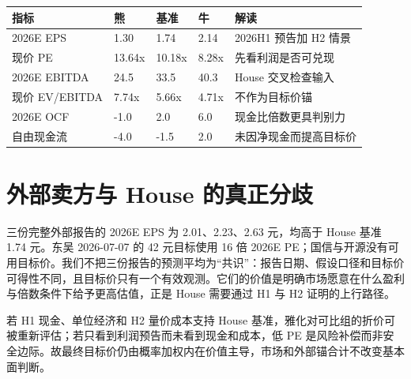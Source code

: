 \begin{exhibitbox}[表 12-2：现价下的盈利和资本约束交叉检查]
\begin{tabularx}{\exhibitboxwidth}{L{3.0cm}R{2.0cm}R{2.0cm}R{2.0cm}X}
\toprule
指标 & 熊 & 基准 & 牛 & 解读 \\
\midrule
2026E EPS & 1.30 & 1.74 & 2.14 & 2026H1 预告加 H2 情景 \\
现价 PE & 13.64x & 10.18x & 8.28x & 先看利润是否可兑现 \\
2026E EBITDA & 24.5 & 33.5 & 40.3 & House 交叉检查输入 \\
现价 EV/EBITDA & 7.74x & 5.66x & 4.71x & 不作为目标价锚 \\
2026E OCF & -1.0 & 2.0 & 6.0 & 现金比倍数更具判别力 \\
自由现金流 & -4.0 & -1.5 & 2.0 & 未因净现金而提高目标价 \\
\bottomrule
\end{tabularx}
\end{exhibitbox}

\section{外部卖方与 House 的真正分歧}

三份完整外部报告的 2026E EPS 为 2.01、2.23、2.63 元，均高于 House 基准 1.74 元。东吴 2026-07-07 的 42 元目标使用 16 倍 2026E PE；国信与开源没有可用目标价。我们不把三份报告的预测平均为“共识”：报告日期、假设口径和目标价可得性不同，且目标价只有一个有效观测。它们的价值是明确市场愿意在什么盈利与倍数条件下给予更高估值，正是 House 需要通过 H1 与 H2 证明的上行路径。

\begin{sourcequalitybox}[相对估值的行动纪律]
若 H1 现金、单位经济和 H2 量价成本支持 House 基准，雅化对可比组的折价可被重新评估；若只看到利润预告而未看到现金和成本，低 PE 是风险补偿而非安全边际。故最终目标价仍由概率加权内在价值主导，市场和外部锚合计不改变基本面判断。
\end{sourcequalitybox}

